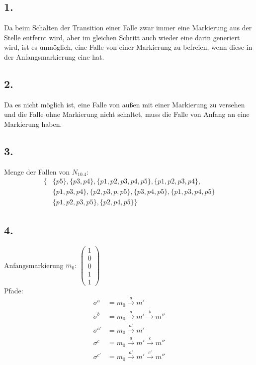 \documentclass[a4paper,12pt]{scrartcl}
\begin{document}
\subsection{1.}
Da beim Schalten der Transition einer Falle zwar immer eine Markierung aus der 
Stelle entfernt wird, aber im gleichen Schritt auch wieder eine darin generiert
wird, ist es unmöglich, eine Falle von einer Markierung zu befreien, wenn diese
in der Anfangsmarkierung eine hat.

\subsection{2.}
Da es nicht möglich ist, eine Falle von außen mit einer Markierung zu versehen
und die Falle ohne Markierung nicht schaltet, muss die Falle von Anfang an eine
Markierung haben.

\subsection{3.}
Menge der Fallen von \(N_{10.4}\):
\begin{equation*}
\begin{split}
	\Big\{ &\{p5\}, \{p3, p4\}, \{p1, p2, p3, p4, p5\}, \{p1, p2, p3, p4\},\\
		   &\{p1, p3, p4\}, \{p2, p3, p, p5\}, \{p3, p4, p5\}, \{p1, p3, p4, p5\} \\
		   &\{p1, p2, p3, p5\}, \{p2, p4, p5\} \Big\}
\end{split}
\end{equation*}

\subsection{4.}
Anfangsmarkierung \(m_0\): \( \begin{pmatrix} 1 \\ 0 \\ 0 \\ 1 \\ 1 \end{pmatrix} \) \\
Pfade:
\begin{align*}
	\sigma^a &= m_0 \xrightarrow{a} m' \\
	\sigma^b &= m_0 \xrightarrow{a} m' \xrightarrow{b} m'' \\
	\sigma^{a'} &= m_0 \xrightarrow{a'} m' \\
	\sigma^c &= m_0 \xrightarrow{a} m' \xrightarrow{c} m'' \\
	\sigma^{c'} &= m_0 \xrightarrow{a'} m' \xrightarrow{c'} m''
\end{align*}
\end{document}
